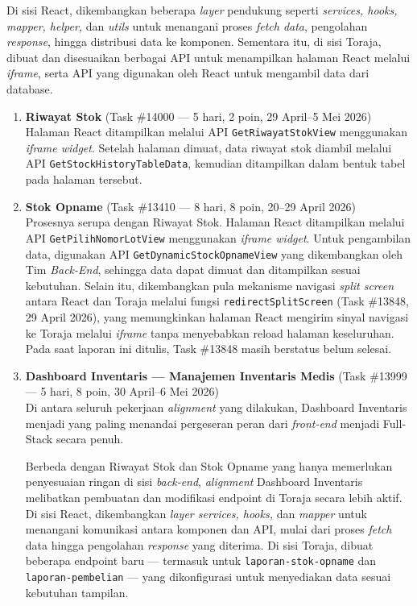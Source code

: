 Di sisi React, dikembangkan beberapa \textit{layer} pendukung seperti
\textit{services, hooks, mapper, helper,} dan \textit{utils} untuk menangani
proses \textit{fetch data}, pengolahan \textit{response}, hingga distribusi
data ke komponen. Sementara itu, di sisi Toraja, dibuat dan disesuaikan
berbagai API untuk menampilkan halaman React melalui \textit{iframe}, serta API
yang digunakan oleh React untuk mengambil data dari database.

\begin{enumerate}
    \item \textbf{Riwayat Stok} (Task \#14000 --- 5 hari, 2 poin, 29 April--5 Mei 2026) \\
          Halaman React ditampilkan melalui API \texttt{GetRiwayatStokView} menggunakan \textit{iframe widget}. Setelah halaman dimuat, data riwayat stok diambil melalui API \texttt{GetStockHistoryTableData}, kemudian ditampilkan dalam bentuk tabel pada halaman tersebut.

    \item \textbf{Stok Opname} (Task \#13410 --- 8 hari, 8 poin, 20--29 April 2026) \\
          Prosesnya serupa dengan Riwayat Stok. Halaman React ditampilkan melalui API \texttt{GetPilihNomorLotView} menggunakan \textit{iframe widget}. Untuk pengambilan data, digunakan API \texttt{GetDynamicStockOpnameView} yang dikembangkan oleh Tim \textit{Back-End}, sehingga data dapat dimuat dan ditampilkan sesuai kebutuhan. Selain itu, dikembangkan pula mekanisme navigasi \textit{split screen} antara React dan Toraja melalui fungsi \texttt{redirectSplitScreen} (Task \#13848, 29 April 2026), yang memungkinkan halaman React mengirim sinyal navigasi ke Toraja melalui \textit{iframe} tanpa menyebabkan reload halaman keseluruhan. Pada saat laporan ini ditulis, Task \#13848 masih berstatus belum selesai.

    \item \textbf{Dashboard Inventaris --- Manajemen Inventaris Medis} (Task \#13999 --- 5 hari, 8 poin, 30 April--6 Mei 2026) \\
          Di antara seluruh pekerjaan \textit{alignment} yang dilakukan, Dashboard Inventaris menjadi yang paling menandai pergeseran peran dari \textit{front-end} menjadi Full-Stack secara penuh.

          Berbeda dengan Riwayat Stok dan Stok Opname yang hanya memerlukan penyesuaian
          ringan di sisi \textit{back-end}, \textit{alignment} Dashboard Inventaris
          melibatkan pembuatan dan modifikasi endpoint di Toraja secara lebih aktif. Di
          sisi React, dikembangkan \textit{layer services, hooks,} dan \textit{mapper}
          untuk menangani komunikasi antara komponen dan API, mulai dari proses
          \textit{fetch} data hingga pengolahan \textit{response} yang diterima. Di sisi
          Toraja, dibuat beberapa endpoint baru --- termasuk untuk
          \texttt{laporan-stok-opname} dan \texttt{laporan-pembelian} --- yang
          dikonfigurasi untuk menyediakan data sesuai kebutuhan tampilan.


\end{enumerate}
